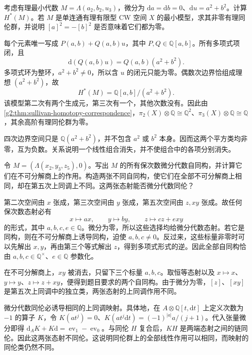 \begin{exercise}\label{g2:ex:minimal-quadratic-relation}
	考虑有理最小代数 \(M=\Lambda(a_2,b_2,u_3)\)，微分为 \(\mathrm da=\mathrm db=0\)、\(\mathrm du=a^2+b^2\)。计算 \(H^*(M)\)。若 \(M\) 是单连通有理有限型 CW 空间 \(X\) 的最小模型，求其非零有理同伦群，并说明 \([a]^2=-[b]^2\) 是否意味着它们都为零。
\end{exercise}
\begin{solution}
	每个元素唯一写成 \(P(a,b)+Q(a,b)u\)，其中 \(P,Q\in\mathbb Q[a,b]\)。所有多项式项闭，且
	\[
		\mathrm d(Q(a,b)u)=Q(a,b)(a^2+b^2).
	\]
	多项式环为整环，\(a^2+b^2\ne0\)，所以含 \(u\) 的闭元只能为零。偶数次边界恰组成理想 \((a^2+b^2)\)，故
	\[
		H^*(M)=\mathbb Q[a,b]/(a^2+b^2).
	\]
	该模型第二次有两个生成元，第三次有一个，其他次数没有。因此由\cref{g2:thm:sullivan-homotopy-correspondence}，\(\pi_2(X)\otimes\mathbb Q\cong\mathbb Q^2\)、\(\pi_3(X)\otimes\mathbb Q\cong\mathbb Q\)，其余高阶有理同伦群为零。

	四次边界空间只是 \(\mathbb Q(a^2+b^2)\)，并不包含 \(a^2\) 或 \(b^2\) 本身。因而这两个平方类均非零，互为负数。关系说明一个线性组合消失，并不使组合中的各项分别消失。
\end{solution}

\begin{exercise}\label{g2:ex:minimal-automorphism-linear-part}
	令 \(M=(\Lambda(x_2,y_3,z_5),0)\)。写出 \(M\) 的所有保次数微分代数自同构，并计算它们在不可分解商上的作用。构造两张不同自同构，使它们在全部不可分解商上相同，却在第五次上同调上不同。这两张态射能否微分代数同伦？
\end{exercise}
\begin{solution}
	第二次空间由 \(x\) 张成，第三次空间由 \(y\) 张成，第五次空间由 \(z,xy\) 张成。故任何保次数态射必有
	\[
		x\longmapsto ax,\qquad y\longmapsto by,\qquad z\longmapsto cz+e xy
	\]
	的形式，其中 \(a,b,c,e\in\mathbb Q\)。微分为零，所以这些选择均给微分代数态射。若它是同构，则在不可分解商上诱导同构，迫使 \(a,b,c\ne0\)。反过来，这些标量非零时可以先解出 \(x,y\)，再由第三个等式解出 \(z\)，得到多项式形式的逆。因此全部自同构恰由 \(a,b,c\in\mathbb Q^\times\)、\(e\in\mathbb Q\) 参数化。

	在不可分解商上，\(xy\) 被消去，只留下三个标量 \(a,b,c\)。取恒等态射以及 \(x\mapsto x\)、\(y\mapsto y\)、\(z\mapsto z+xy\)，便得到题目要求的两个自同构。由于微分为零，\([z]\)、\([xy]\) 是第五次上同调中的独立类，两张态射的上同调作用不同。

	微分代数同伦必诱导相同的上同调映射。具体地，在 \(A\otimes\mathbb Q[t,\mathrm dt]\) 上定义次数为 \(-1\) 的算子 \(K\)，令 \(K(a t^j)=0\)、\(K(a t^j\mathrm dt)=(-1)^{|a|}a/(j+1)\)。代入张量微分即得 \(\mathrm d_AK+K\mathrm d=\operatorname{ev}_1-\operatorname{ev}_0\)。与同伦 \(H\) 复合后，\(KH\) 是两端态射之间的链同伦。因此这两张态射不同伦。这说明同伦群上的全部线性作用可以相同，而映射的同伦类仍然不同。
\end{solution}

